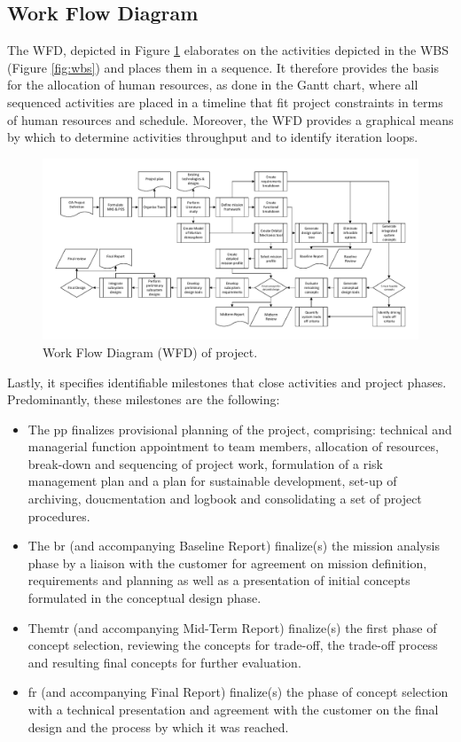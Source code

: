 \subsection{Work Flow Diagram}\label{sec:WFD}
The WFD, depicted in Figure \ref{fig:wfd} elaborates on the activities depicted in the WBS (Figure \ref{fig:wbs}) and places them in a sequence. It therefore provides the basis for the allocation of human resources, as done in the Gantt chart, where all sequenced activities are placed in a timeline that fit project constraints in terms of human resources and schedule. Moreover, the WFD provides a graphical means by which to determine activities throughput and to identify iteration loops. 

\begin{figure}
    \includegraphics[scale=0.8]{Figure/WFD2.pdf}
    \caption{Work Flow Diagram (WFD) of project.}
    \label{fig:wfd}
\end{figure}

Lastly, it specifies identifiable milestones that close activities and project phases. Predominantly, these milestones are the following:
\begin{itemize}
\item The \gls{pp} finalizes provisional planning of the project, comprising: technical and managerial function appointment to team members, allocation of resources, break-down and sequencing of project work, formulation of a risk management plan and a plan for sustainable development, set-up of archiving, doucmentation and logbook and consolidating a set of project procedures.
\item The \gls{br} (and accompanying Baseline Report) finalize(s) the mission analysis phase by a liaison with the customer for agreement on mission definition, requirements and planning as well as a presentation of initial concepts formulated in the conceptual design phase.
\item The\gls{mtr} (and accompanying Mid-Term Report) finalize(s) the first phase of concept selection, reviewing the concepts for trade-off, the trade-off process and resulting final concepts for further evaluation.
\item \gls{fr} (and accompanying Final Report) finalize(s) the phase of concept selection with a technical presentation and agreement with the customer on the final design and the process by which it was reached. 
\end{itemize}

